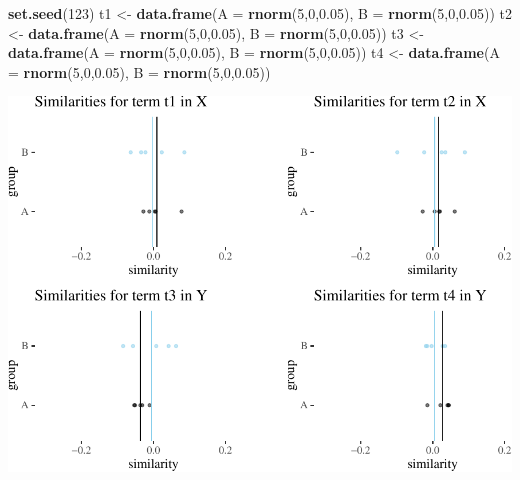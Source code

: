 \documentclass[10pt,dvipsnames,enabledeprecatedfontcommands]{scrartcl}
\newenvironment{Shaded}{\begin{snugshade}}{\end{snugshade}}
\newcommand{\KeywordTok}[1]{\textcolor[rgb]{0.13,0.29,0.53}{\textbf{#1}}}
\newcommand{\DataTypeTok}[1]{\textcolor[rgb]{0.13,0.29,0.53}{#1}}
\newcommand{\DecValTok}[1]{\textcolor[rgb]{0.00,0.00,0.81}{#1}}
\newcommand{\FloatTok}[1]{\textcolor[rgb]{0.00,0.00,0.81}{#1}}
\newcommand{\StringTok}[1]{\textcolor[rgb]{0.31,0.60,0.02}{#1}}
\newcommand{\NormalTok}[1]{#1}
\begin{document}
\begin{Shaded}
\begin{Highlighting}[]
\KeywordTok{set.seed}\NormalTok{(}\DecValTok{123}\NormalTok{)}
\NormalTok{t1 <-}\StringTok{ }\KeywordTok{data.frame}\NormalTok{(}\DataTypeTok{A  =} \KeywordTok{rnorm}\NormalTok{(}\DecValTok{5}\NormalTok{,}\DecValTok{0}\NormalTok{,}\FloatTok{0.05}\NormalTok{), }\DataTypeTok{B =} \KeywordTok{rnorm}\NormalTok{(}\DecValTok{5}\NormalTok{,}\DecValTok{0}\NormalTok{,}\FloatTok{0.05}\NormalTok{))}
\NormalTok{t2 <-}\StringTok{ }\KeywordTok{data.frame}\NormalTok{(}\DataTypeTok{A  =} \KeywordTok{rnorm}\NormalTok{(}\DecValTok{5}\NormalTok{,}\DecValTok{0}\NormalTok{,}\FloatTok{0.05}\NormalTok{), }\DataTypeTok{B =} \KeywordTok{rnorm}\NormalTok{(}\DecValTok{5}\NormalTok{,}\DecValTok{0}\NormalTok{,}\FloatTok{0.05}\NormalTok{))}
\NormalTok{t3 <-}\StringTok{ }\KeywordTok{data.frame}\NormalTok{(}\DataTypeTok{A  =} \KeywordTok{rnorm}\NormalTok{(}\DecValTok{5}\NormalTok{,}\DecValTok{0}\NormalTok{,}\FloatTok{0.05}\NormalTok{), }\DataTypeTok{B =} \KeywordTok{rnorm}\NormalTok{(}\DecValTok{5}\NormalTok{,}\DecValTok{0}\NormalTok{,}\FloatTok{0.05}\NormalTok{))}
\NormalTok{t4 <-}\StringTok{ }\KeywordTok{data.frame}\NormalTok{(}\DataTypeTok{A  =} \KeywordTok{rnorm}\NormalTok{(}\DecValTok{5}\NormalTok{,}\DecValTok{0}\NormalTok{,}\FloatTok{0.05}\NormalTok{), }\DataTypeTok{B =} \KeywordTok{rnorm}\NormalTok{(}\DecValTok{5}\NormalTok{,}\DecValTok{0}\NormalTok{,}\FloatTok{0.05}\NormalTok{))}
\end{Highlighting}
\end{Shaded}

\normalsize

\begin{center}\includegraphics[width=1\linewidth]{paperDraft_files/figure-latex/unnamed-chunk-2-1} \end{center}
\end{document}
